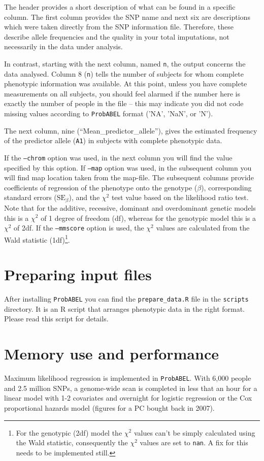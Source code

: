 \documentclass[12pt,a4paper]{article}
\newcommand{\PA}{\texttt{ProbABEL}}
\begin{document}
The header provides a short description of what can be found in a
specific column. The first column provides the SNP name and
next six are descriptions which were taken directly from the
SNP information file. Therefore, these describe allele frequencies and
the quality in your total imputations, not necessarily in the data under
analysis.

In contrast, starting with the next column, named \texttt{n},
the output concerns the data analysed. Column 8 (\texttt{n}) tells the
number of subjects for whom complete phenotypic information was
available. At this point, unless you have complete measurements on all
subjects, you should feel alarmed if the number here is exactly the
number of people in the file -- this may indicate you did not code
missing values according to \PA{} format ('NA', 'NaN', or 'N').

The next column, nine (``Mean\_predictor\_allele''), gives the estimated
frequency of the predictor allele (\texttt{A1}) in subjects with complete
phenotypic data.

If the \texttt{--chrom} option was used, in the next column you will
find the value specified by this option. If \texttt{--map} option was
used, in the subsequent column you will find map location taken from
the map-file. The subsequent columns provide coefficients of
regression of the phenotype onto the genotype ($\beta$), corresponding
standard errors ($\text{SE}_\beta$), and the $\chi^2$ test value based
on the likelihood ratio test. Note that for the additive, recessive,
dominant and overdominant genetic models this is a $\chi^2$ of 1
degree of freedom (df), whereas for the genotypic model this is a
$\chi^2$ of 2df. If the \texttt{--mmscore} option is used, the
$\chi^2$ values are calculated from the Wald statistic
(1df)\footnote{For the genotypic (2df) model the $\chi^2$ values can't
  be simply calculated using the Wald statistic, consequently the
  $\chi^2$ values are set to \texttt{nan}. A fix for this needs to be
  implemented still.}.

\section{Preparing input files}
After installing \PA{} you can find the \texttt{prepare\_data.R} file
in the \texttt{scripts} directory. It is an R script that arranges
phenotypic data in the right format. Please read this script for
details.

\section{Memory use and performance}
Maximum likelihood regression is implemented in
\PA{}. With 6,000 people and 2.5 million SNPs, a
genome-wide scan is completed in less that an hour for a linear model
with 1-2 covariates and overnight for logistic regression or the Cox
proportional hazards model (figures for a PC bought back in 2007).
\end{document}
